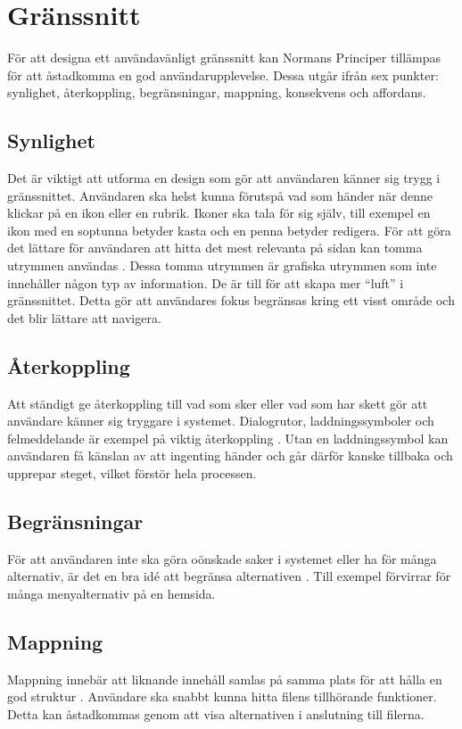 \section{Gränssnitt}
För att designa ett användavänligt gränssnitt kan Normans Principer\cite{norman} tillämpas för att åstadkomma en god användarupplevelse. Dessa utgår ifrån sex punkter: synlighet, återkoppling, begränsningar, mappning, konsekvens och affordans.

\subsection{Synlighet}
Det är viktigt att utforma en design som gör att användaren känner sig trygg i gränssnittet. Användaren ska helst kunna förutspå vad som händer när denne klickar på en ikon eller en rubrik. Ikoner ska tala för sig själv, till exempel en ikon med en soptunna betyder kasta och en penna betyder redigera. För att göra det lättare för användaren att hitta det mest relevanta på sidan kan tomma utrymmen användas \cite{whitespace}. Dessa tomma utrymmen är grafiska utrymmen som inte innehåller någon typ av information. De är till för att skapa mer “luft” i gränssnittet. Detta gör att användares fokus begränsas kring ett visst område och det blir lättare att navigera.

\subsection{Återkoppling}
Att ständigt ge återkoppling till vad som sker eller vad som har skett gör att användare känner sig tryggare i systemet. Dialogrutor, laddningssymboler och felmeddelande är exempel på viktig återkoppling \cite{whitespace}. Utan en laddningssymbol kan användaren få känslan av att ingenting händer och går därför kanske tillbaka och upprepar steget, vilket förstör hela processen.

\subsection{Begränsningar}
För att användaren inte ska göra oönskade saker i systemet eller ha för många alternativ, är det en bra idé att begränsa alternativen \cite{whitespace}. Till exempel förvirrar för många menyalternativ på en hemsida.

\subsection{Mappning}
Mappning innebär att liknande innehåll samlas på samma plats för att hålla en god struktur \cite{whitespace}. Användare ska snabbt kunna hitta filens tillhörande funktioner. Detta kan åstadkommas genom att visa alternativen i anslutning till filerna.

